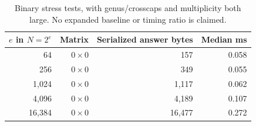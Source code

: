 \begin{table}[ht]
\centering
\begin{tabular}{@{}rrrr@{}}
\toprule
$e$ in $N=2^e$ & Matrix & Serialized answer bytes & Median ms\\
\midrule
64 & $0\times0$ & 157 & 0.058 \\
256 & $0\times0$ & 349 & 0.055 \\
1,024 & $0\times0$ & 1,117 & 0.062 \\
4,096 & $0\times0$ & 4,189 & 0.107 \\
16,384 & $0\times0$ & 16,477 & 0.272 \\
\bottomrule
\end{tabular}
\caption{Binary stress tests, with genus/crosscaps and multiplicity both large. No expanded baseline or timing ratio is claimed.}
\label{tab:binary}
\end{table}
